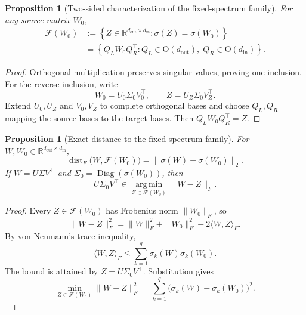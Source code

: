 \documentclass[11pt, a4paper]{utda}
\theoremstyle{plain}
\newtheorem{proposition}[theorem]{Proposition}
\theoremstyle{definition}
\theoremstyle{remark}
\begin{document}
\begin{proposition}[Two-sided characterization of the fixed-spectrum family]
\label{prop:app_orbit_characterization}
For any source matrix $W_0$,
\begin{equation}
\label{eq:app_source_orbit}
\begin{aligned}
    \mathcal F(W_0)
    &:=
    \left\{
        Z\in
        \mathbb{R}^{d_{\mathrm{out}}\times d_{\mathrm{in}}}
        :
        \sigma(Z)=\sigma(W_0)
    \right\}
    \\
    &=
    \left\{
        Q_LW_0Q_R^\top:
        Q_L\in\mathrm O(d_{\mathrm{out}}),
        \;
        Q_R\in\mathrm O(d_{\mathrm{in}})
    \right\}.
\end{aligned}
\end{equation}
\end{proposition}

\begin{proof}
Orthogonal multiplication preserves singular values, proving one inclusion.
For the reverse inclusion, write
\[
    W_0=U_0\Sigma_0V_0^\top,
    \qquad
    Z=U_Z\Sigma_0V_Z^\top.
\]
Extend $U_0,U_Z$ and $V_0,V_Z$ to complete orthogonal bases and choose
$Q_L,Q_R$ mapping the source bases to the target bases. Then
$Q_LW_0Q_R^\top=Z$.
\end{proof}

\begin{proposition}[Exact distance to the fixed-spectrum family]
\label{prop:app_isospectral_projection}
For
$W,W_0\in\mathbb{R}^{d_{\mathrm{out}}\times d_{\mathrm{in}}}$,
\begin{equation}
\label{eq:app_exact_orbit_distance}
    \operatorname{dist}_F
    \bigl(
        W,\mathcal F(W_0)
    \bigr)
    =
    \|\sigma(W)-\sigma(W_0)\|_2.
\end{equation}
If
$W=U\Sigma V^\top$ and
$\Sigma_0=\operatorname{Diag}(\sigma(W_0))$, then
\begin{equation}
\label{eq:app_nearest_orbit_point}
    U\Sigma_0V^\top
    \in
    \operatorname*{arg\,min}_{Z\in\mathcal F(W_0)}
    \|W-Z\|_F.
\end{equation}
\end{proposition}

\begin{proof}
Every $Z\in\mathcal F(W_0)$ has Frobenius norm $\|W_0\|_F$, so
\[
    \|W-Z\|_F^2
    =
    \|W\|_F^2+\|W_0\|_F^2-2\langle W,Z\rangle_F.
\]
By von Neumann's trace inequality,
\[
    \langle W,Z\rangle_F
    \leq
    \sum_{k=1}^q
    \sigma_k(W)\sigma_k(W_0).
\]
The bound is attained by $Z=U\Sigma_0V^\top$. Substitution gives
\[
    \min_{Z\in\mathcal F(W_0)}
    \|W-Z\|_F^2
    =
    \sum_{k=1}^q
    \bigl(
        \sigma_k(W)-\sigma_k(W_0)
    \bigr)^2.
\]
\end{proof}
\end{document}
